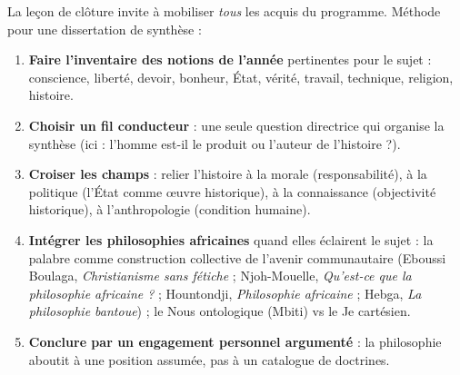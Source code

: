 \documentclass[11pt]{article}
\begin{document}
\begin{methode}
La leçon de clôture invite à mobiliser \emph{tous} les acquis du programme. Méthode pour une dissertation de synthèse :
\begin{enumerate}
\item \textbf{Faire l'inventaire des notions de l'année} pertinentes pour le sujet : conscience, liberté, devoir, bonheur, État, vérité, travail, technique, religion, histoire.
\item \textbf{Choisir un fil conducteur} : une seule question directrice qui organise la synthèse (ici : l'homme est-il le produit ou l'auteur de l'histoire ?).
\item \textbf{Croiser les champs} : relier l'histoire à la morale (responsabilité), à la politique (l'État comme œuvre historique), à la connaissance (objectivité historique), à l'anthropologie (condition humaine).
\item \textbf{Intégrer les philosophies africaines} quand elles éclairent le sujet : la palabre comme construction collective de l'avenir communautaire (Eboussi Boulaga, \emph{Christianisme sans fétiche} ; Njoh-Mouelle, \emph{Qu'est-ce que la philosophie africaine ?} ; Hountondji, \emph{Philosophie africaine} ; Hebga, \emph{La philosophie bantoue}) ; le \guillemotleft Nous \guillemotright ontologique (Mbiti) vs le \guillemotleft Je \guillemotright cartésien.
\item \textbf{Conclure par un engagement personnel argumenté} : la philosophie aboutit à une position assumée, pas à un catalogue de doctrines.
\end{enumerate}
\end{methode}
\end{document}
